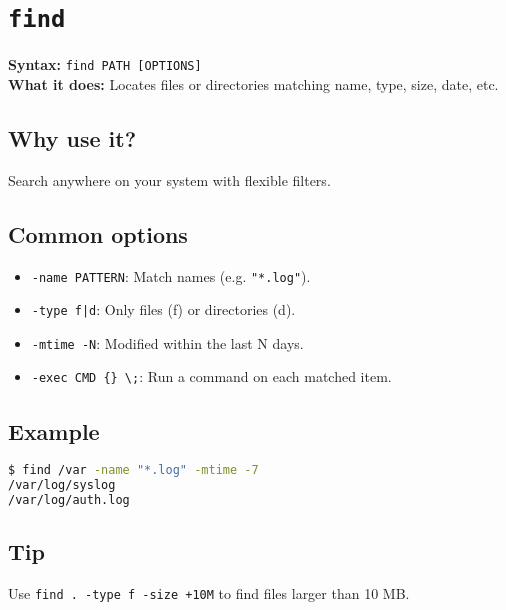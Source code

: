 \documentclass[10pt,oneside]{scrbook}
\begin{document}
\section{\texttt{find}}
\begin{cmdbox}
  \textbf{Syntax:} \lstinline!find PATH [OPTIONS]! \\
  \textbf{What it does:} Locates files or directories matching name, type, size, date, etc.
\end{cmdbox}
\begin{commanddetails}
  \subsection*{Why use it?}
    Search anywhere on your system with flexible filters.

  \subsection*{Common options}
  \begin{itemize}
    \item \lstinline!-name PATTERN!: Match names (e.g. \lstinline!"*.log"!).
    \item \lstinline!-type f|d!: Only files (f) or directories (d).
    \item \lstinline!-mtime -N!: Modified within the last N days.
    \item \lstinline!-exec CMD {} \;!: Run a command on each matched item.
  \end{itemize}

  \subsection*{Example}
  \begin{lstlisting}[language=bash]
$ find /var -name "*.log" -mtime -7
/var/log/syslog
/var/log/auth.log
  \end{lstlisting}

  \subsection*{Tip}
    Use \lstinline!find . -type f -size +10M! to find files larger than 10 MB.
\end{commanddetails}

\end{document}

